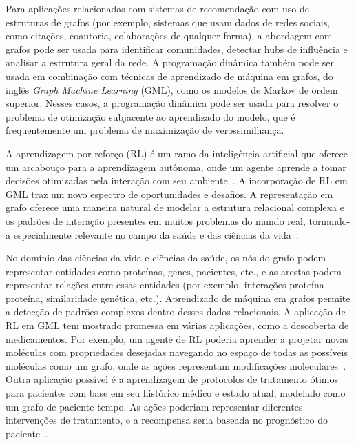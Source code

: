 Para aplicações relacionadas com sistemas de recomendação com uso de estruturas de grafos (por exemplo, sistemas que usam dados de redes sociais, como citações, coautoria, colaborações de qualquer forma), a abordagem com grafos pode ser usada para identificar comunidades, detectar hubs de influência e analisar a estrutura geral da rede. A programação dinâmica também pode ser usada em combinação com técnicas de aprendizado de máquina em grafos, do inglês \textit{Graph Machine Learning} (GML), como os modelos de Markov de ordem superior. Nesses casos, a programação dinâmica pode ser usada para resolver o problema de otimização subjacente ao aprendizado do modelo, que é frequentemente um problema de maximização de verossimilhança.

A aprendizagem por reforço (RL) é um ramo da inteligência artificial que oferece um arcabouço para a aprendizagem autônoma, onde um agente aprende a tomar decisões otimizadas pela interação com seu ambiente~\cite{SuttonBarto1998}. A incorporação de RL em GML traz um novo espectro de oportunidades e desafios. A representação em grafo oferece uma maneira natural de modelar a estrutura relacional complexa e os padrões de interação presentes em muitos problemas do mundo real, tornando-a especialmente relevante no campo da saúde e das ciências da vida~\cite{Zhang2020}. 

No domínio das ciências da vida e ciências da saúde, os nós do grafo podem representar entidades como proteínas, genes, pacientes, etc., e as arestas podem representar relações entre essas entidades (por exemplo, interações proteína-proteína, similaridade genética, etc.). Aprendizado de máquina em grafos permite a detecção de padrões complexos dentro desses dados relacionais. A aplicação de RL em GML tem mostrado promessa em várias aplicações, como a descoberta de medicamentos. Por exemplo, um agente de RL poderia aprender a projetar novas moléculas com propriedades desejadas navegando no espaço de todas as possíveis moléculas como um grafo, onde as ações representam modificações moleculares~\cite{You2018}. Outra aplicação possível é a aprendizagem de protocolos de tratamento ótimos para pacientes com base em seu histórico médico e estado atual, modelado como um grafo de paciente-tempo. As ações poderiam representar diferentes intervenções de tratamento, e a recompensa seria baseada no prognóstico do paciente~\cite{Weng2020}.